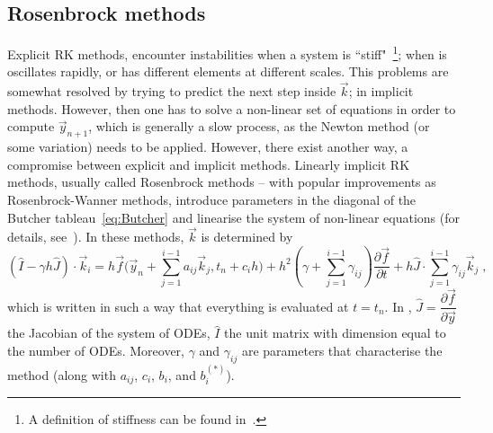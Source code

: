\documentclass[11pt,a4paper]{article}
\begin{document}
\subsection{Rosenbrock methods}
%
Explicit RK methods, encounter instabilities when a system is ``stiff"~\footnote{A definition of stiffness can be found in~\cite{hairer2010solving,Hairer}.}; when is oscillates rapidly, or has different elements at different scales. This problems are somewhat resolved by trying to predict the next step inside $\vec{k}$; \ie in implicit methods. However, then one has to solve a non-linear set of equations in order to compute $\vec{y}_{n+1}$, which is generally a slow process, as the Newton method (or some variation) needs to be applied. However, there exist another way, a compromise between explicit and implicit methods.  Linearly implicit RK methods, usually called Rosenbrock methods -- with popular improvements as Rosenbrock-Wanner methods, introduce  parameters in the diagonal of the Butcher tableau~\ref{eq:Butcher} and linearise the system of  non-linear equations (for details, see~\cite{hairer2010solving}). In these methods, $\vec{k}$ is determined by  
%
\begin{equation}
	\left(\hat I - \gamma h \hat{J}\right)\cdot \vec{k}_{i}=
	h \vec{f}\Big(\vec{y}_n+\sum_{j=1}^{i-1}a_{ij}\vec{k}_{j},t_n + c_{i}h \Big)+
	h^2 \left(\gamma + \sum_{j=1}^{i-1}\gamma_{ij}\right)\dfrac{\partial \vec{f} }{\partial t}+
	h \hat J \cdot \sum_{j=1}^{i-1}\gamma_{ij} \vec{k}_{j}\; ,
	\label{eq:Ros_k}
\end{equation}
%
which is written in such a way that everything is evaluated at $t = t_{n}$. In ,  $\hat J = \dfrac{\partial \vec f}{ \partial \vec y}$ the Jacobian of the system of ODEs, $\hat I$ the unit matrix with dimension equal to the number of ODEs. Moreover, $\gamma$ and $\gamma_{ij}$ are parameters that characterise the method (along with $a_{ij}$, $c_i$,  $b_i$, and $b_i^{(*)}$).
\end{document}
